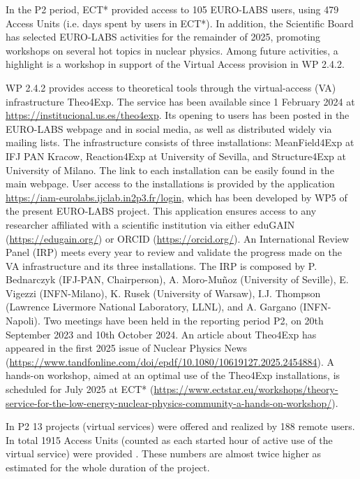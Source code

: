 In the P2 period, ECT* provided access to 105 EURO-LABS users, using 479 Access Units (i.e. days spent by users in ECT*). In addition, the Scientific Board has selected EURO-LABS activities for the remainder of 2025, promoting workshops on several hot topics in nuclear physics.  
Among future activities, a highlight is a workshop in support of the Virtual Access provision in WP 2.4.2. 


WP 2.4.2 provides access to theoretical tools through the virtual-access (VA) infrastructure Theo4Exp. The service has been available since 1 February 2024 at \url{https://institucional.us.es/theo4exp}. Its opening to users has been posted in the EURO-LABS webpage and in social media, as well as distributed widely via mailing lists. The infrastructure consists of three installations: MeanField4Exp at IFJ PAN Kracow, Reaction4Exp at University of Sevilla, and Structure4Exp at University of Milano. The link to each installation can be easily found in the main webpage. User access to the installations is provided by the application \url{https://iam-eurolabs.ijclab.in2p3.fr/login}, which has been developed by WP5 of the present EURO-LABS project. This application ensures access to any researcher affiliated with a scientific institution via either eduGAIN (\url{https://edugain.org/}) or ORCID (\url{https://orcid.org/}).
An International Review Panel (IRP) meets every year to review and validate the progress made on the VA infrastructure and its three installations. The IRP is composed by P. Bednarczyk (IFJ-PAN, Chairperson), A. Moro-Mu\~noz (University of Seville), E. Vigezzi (INFN-Milano), K. Rusek (University of Warsaw), I.J. Thompson (Lawrence Livermore National Laboratory, LLNL), and A. Gargano (INFN-Napoli). Two meetings have been held in the reporting period P2, on 20th September 2023 and 10th October 2024. An article about Theo4Exp has appeared in the first 2025 issue of Nuclear Physics News 
(\url{https://www.tandfonline.com/doi/epdf/10.1080/10619127.2025.2454884}). 
A hands-on workshop, aimed at an optimal use of the Theo4Exp installations, is scheduled for July 2025 at ECT* (\url{https://www.ectstar.eu/workshops/theory-service-for-the-low-energy-nuclear-physics-community-a-hands-on-workshop/}).

In P2 13 projects (virtual services) were offered and realized by 188 remote users. In total 1915 Access Units (counted as each started hour of active use of the virtual service) were provided . These numbers are almost twice higher as estimated for the whole duration of the project.


